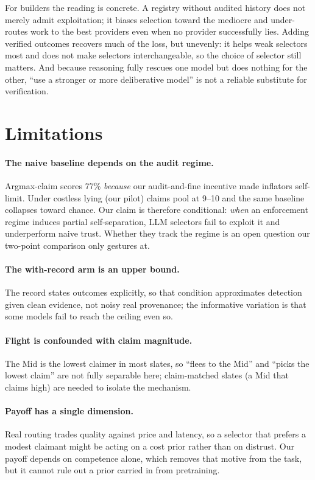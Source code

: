\documentclass[11pt]{article}
\begin{document}
For builders the reading is concrete. A registry without audited history does not merely
admit exploitation; it biases selection toward the mediocre and under-routes work to the
best providers even when no provider successfully lies. Adding verified outcomes recovers
much of the loss, but unevenly: it helps weak selectors most and does not make selectors
interchangeable, so the choice of selector still matters. And because reasoning fully
rescues one model but does nothing for the other, ``use a stronger or more deliberative
model'' is not a reliable substitute for verification.

\section*{Limitations}

\paragraph{The naive baseline depends on the audit regime.} Argmax-claim scores 77\%
\emph{because} our audit-and-fine incentive made inflators self-limit. Under costless
lying (our pilot) claims pool at 9--10 and the same baseline collapses toward chance. Our
claim is therefore conditional: \emph{when} an enforcement regime induces partial
self-separation, LLM selectors fail to exploit it and underperform naive trust. Whether
they track the regime is an open question our two-point comparison only gestures at.

\paragraph{The with-record arm is an upper bound.} The record states outcomes explicitly,
so that condition approximates detection given clean evidence, not noisy real provenance;
the informative variation is that some models fail to reach the ceiling even so.

\paragraph{Flight is confounded with claim magnitude.} The Mid is the lowest claimer in
most slates, so ``flees to the Mid'' and ``picks the lowest claim'' are not fully
separable here; claim-matched slates (a Mid that claims high) are needed to isolate the
mechanism.

\paragraph{Payoff has a single dimension.} Real routing trades quality against price and
latency, so a selector that prefers a modest claimant might be acting on a cost prior rather
than on distrust. Our payoff depends on competence alone, which removes that motive from the
task, but it cannot rule out a prior carried in from pretraining.
\end{document}
